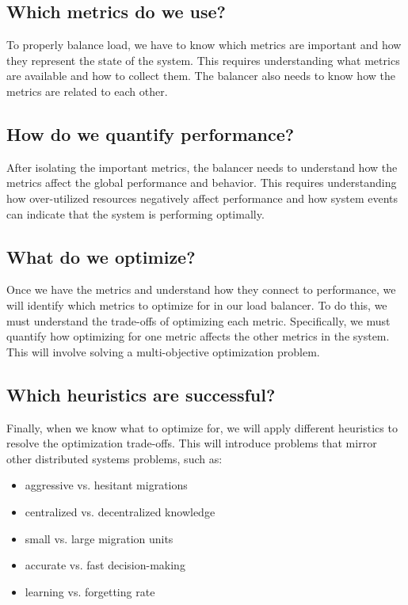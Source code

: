 \subsection*{Which metrics do we use?}
To properly balance load, we have to know which metrics are important and how they represent the state of the system. This requires understanding what metrics are available and how to collect them. The balancer also needs to know how the metrics are related to each other.

\subsection*{How do we quantify performance?}
After isolating the important metrics, the balancer needs to understand how the metrics affect the global performance and behavior. This requires understanding how over-utilized resources negatively affect performance and how system events can indicate that the system is performing optimally.

\subsection*{What do we optimize?}
Once we have the metrics and understand how they connect to performance, we will identify which metrics to optimize for in our load balancer. To do this, we must understand the trade-offs of optimizing each metric. Specifically, we must quantify how optimizing for one metric affects the other metrics in the system. This will involve solving a multi-objective optimization problem. 

\subsection*{Which heuristics are successful?}
Finally, when we know what to optimize for, we will apply different heuristics to resolve the optimization trade-offs. This will introduce problems that mirror other distributed systems problems, such as:
\begin{itemize}
	\item aggressive vs. hesitant migrations	
	\item centralized vs. decentralized knowledge
	\item small vs. large migration units
	\item accurate vs. fast decision-making
	\item learning vs. forgetting rate
\end{itemize}

